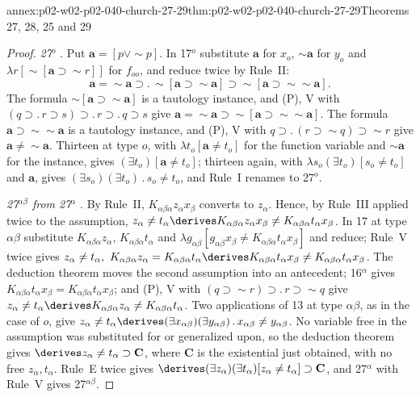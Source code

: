 \begin{annexitem}{annex:p02-w02-p02-040-church-27-29}{thm:p02-w02-p02-040-church-27-29}{Theorems 27, 28, 25 and 29}
\begin{proof}
\emph{27\(^o\)} \cite[\S6, pp.~64--65]{Church1940}.  Put
\(\mathbf a=[p\vee\sim p]\).  In 17\(^o\) substitute \(\mathbf a\) for
\(x_o\), \(\sim\mathbf a\) for \(y_o\) and
\(\lambda r[\sim[\mathbf a\supset\sim r]]\) for \(f_{oo}\), and reduce twice
by Rule~II:
\[
 \mathbf a=\sim\mathbf a\supset.\,\sim[\mathbf a\supset\sim\mathbf a]\supset\sim[\mathbf a\supset\sim\sim\mathbf a].
\]
The formula \(\sim[\mathbf a\supset\sim\mathbf a]\) is a tautology instance,
and (P), V with \((q\supset.\,r\supset s)\supset.\,r\supset.\,q\supset s\)
give \(\mathbf a=\sim\mathbf a\supset\sim[\mathbf a\supset\sim\sim\mathbf a]\).
The formula \(\mathbf a\supset\sim\sim\mathbf a\) is a tautology instance, and
(P), V with \(q\supset.\,(r\supset\sim q)\supset\sim r\) give
\(\mathbf a\neq\sim\mathbf a\).  Thirteen at type \(o\), with
\(\lambda t_o[\mathbf a\neq t_o]\) for the function variable and
\(\sim\mathbf a\) for the instance, gives
\((\exists t_o)[\mathbf a\neq t_o]\); thirteen again, with
\(\lambda s_o(\exists t_o)[s_o\neq t_o]\) and \(\mathbf a\), gives
\((\exists s_o)(\exists t_o)\,.\,s_o\neq t_o\), and Rule~I renames to 27\(^o\).

\emph{27\(^{\alpha\beta}\) from 27\(^\alpha\)} \cite[\S6, p.~65]{Church1940}.
By Rule~II, \(K_{\alpha\beta\alpha}z_\alpha x_\beta\) converts to \(z_\alpha\).
Hence, by Rule~III applied twice to the assumption,
\(z_\alpha\neq t_\alpha\derives K_{\alpha\beta\alpha}z_\alpha x_\beta\neq K_{\alpha\beta\alpha}t_\alpha x_\beta\).
In 17 at type \(\alpha\beta\) substitute \(K_{\alpha\beta\alpha}z_\alpha\),
\(K_{\alpha\beta\alpha}t_\alpha\) and
\(\lambda g_{\alpha\beta}[g_{\alpha\beta}x_\beta\neq K_{\alpha\beta\alpha}t_\alpha x_\beta]\)
and reduce; Rule~V twice gives
\(z_\alpha\neq t_\alpha,\ K_{\alpha\beta\alpha}z_\alpha=K_{\alpha\beta\alpha}t_\alpha
\derives K_{\alpha\beta\alpha}t_\alpha x_\beta\neq K_{\alpha\beta\alpha}t_\alpha x_\beta\).
The deduction theorem moves the second assumption into an antecedent;
16\(^\alpha\) gives
\(K_{\alpha\beta\alpha}t_\alpha x_\beta=K_{\alpha\beta\alpha}t_\alpha x_\beta\); and
(P), V with \((q\supset\sim r)\supset.\,r\supset\sim q\) give
\(z_\alpha\neq t_\alpha\derives K_{\alpha\beta\alpha}z_\alpha\neq K_{\alpha\beta\alpha}t_\alpha\).
Two applications of 13 at type \(\alpha\beta\), as in the case of \(o\), give
\(z_\alpha\neq t_\alpha\derives(\exists x_{\alpha\beta})(\exists y_{\alpha\beta})\,.\,x_{\alpha\beta}\neq y_{\alpha\beta}\).
No variable free in the assumption was substituted for or generalized
upon, so the deduction theorem gives
\(\derives z_\alpha\neq t_\alpha\supset\mathbf C\), where \(\mathbf C\) is the
existential just obtained, with no free \(z_\alpha,t_\alpha\).  Rule~E twice gives
\(\derives(\exists z_\alpha)(\exists t_\alpha)[z_\alpha\neq t_\alpha]\supset\mathbf C\),
and 27\(^\alpha\) with Rule~V gives 27\(^{\alpha\beta}\).


\end{proof}
\end{annexitem}
